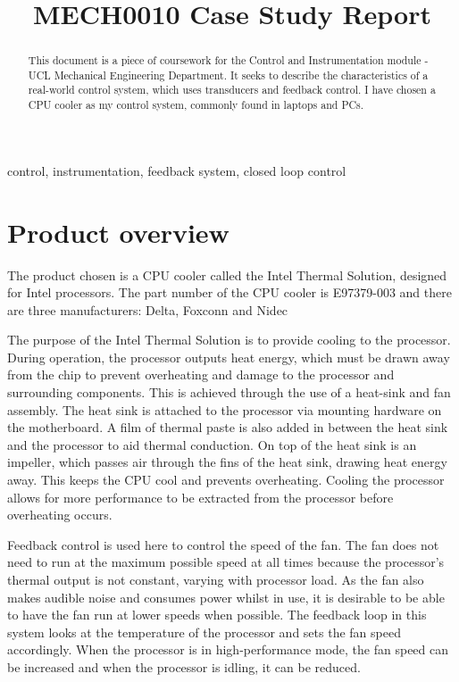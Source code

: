 \documentclass[conference]{IEEEtran}
\begin{document}
\title{MECH0010 Case Study Report}

\author{}

\maketitle

\begin{abstract}
This document is a piece of coursework for the Control and Instrumentation module - UCL Mechanical Engineering Department. It seeks to describe the characteristics of a real-world control system, which uses transducers and feedback control. I have chosen a CPU cooler as my control system, commonly found in laptops and PCs.
\end{abstract}

\begin{IEEEkeywords}
control, instrumentation, feedback system, closed loop control
\end{IEEEkeywords}

\section{Product overview}
The product chosen is a CPU cooler called the Intel Thermal Solution, designed for Intel processors. The part number of the CPU cooler is E97379-003 and there are three manufacturers: Delta, Foxconn and Nidec \cite{b1}

The purpose of the Intel Thermal Solution is to provide cooling to the processor. During operation, the processor outputs heat energy, which must be drawn away from the chip to prevent overheating and damage to the processor and surrounding components. This is achieved through the use of a heat-sink and fan assembly. The heat sink is attached to the processor via mounting hardware on the motherboard. A film of thermal paste is also added in between the heat sink and the processor to aid thermal conduction. On top of the heat sink is an impeller, which passes air through the fins of the heat sink, drawing heat energy away. This keeps the CPU cool and prevents overheating. Cooling the processor allows for more performance to be extracted from the processor before overheating occurs. 

Feedback control is used here to control the speed of the fan. The fan does not need to run at the maximum possible speed at all times because the processor's thermal output is not constant, varying with processor load. As the fan also makes audible noise and consumes power whilst in use, it is desirable to be able to have the fan run at lower speeds when possible. The feedback loop in this system looks at the temperature of the processor and sets the fan speed accordingly. When the processor is in high-performance mode, the fan speed can be increased and when the processor is idling, it can be reduced. 
\end{document}

